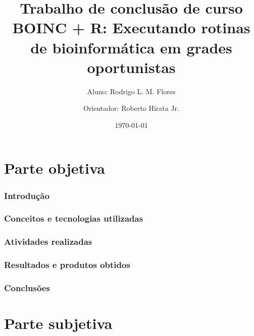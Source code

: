 \documentclass[a4paper,12pt,titlepage]{article}
\title{Trabalho de conclusão de curso \\
BOINC + R: Executando rotinas de bioinformática em grades oportunistas}
\author{Aluno: Rodrigo L. M. Flores \and
        Orientador: Roberto Hirata Jr. }
\date{\today}
\begin{document}
\maketitle

\nocite{wiki:volunteercomputing}
\nocite{wiki:interpretedlanguage}
\nocite{wiki:boinc}
\nocite{wiki:r}
\nocite{boinc_wrapper}
\nocite{hungaro}
\nocite{nytimes}

\tableofcontents

\pagebreak

\part{Parte objetiva}

\section{Introdução}



\newpage

\section{Conceitos e tecnologias utilizadas}



\newpage

\section{Atividades realizadas}



\newpage

\section{Resultados e produtos obtidos}




\newpage

\section{Conclusões}



\newpage





\newpage


\part{Parte subjetiva}


\end{document}
